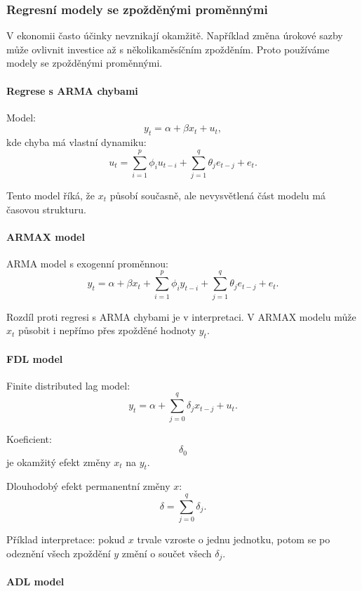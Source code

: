 \subsubsection{Regresní modely se zpožděnými proměnnými}

V ekonomii často účinky nevznikají okamžitě. Například změna úrokové sazby může ovlivnit investice
až s několikaměsíčním zpožděním. Proto používáme modely se zpožděnými proměnnými.

\paragraph{Regrese s ARMA chybami}

Model:
\[
    y_t=\alpha+\beta x_t+u_t,
\]
kde chyba má vlastní dynamiku:
\[
    u_t=
    \sum_{i=1}^{p}\phi_i u_{t-i}
    +
    \sum_{j=1}^{q}\theta_j e_{t-j}
    +e_t.
\]

Tento model říká, že $x_t$ působí současně, ale nevysvětlená část modelu má časovou strukturu.

\paragraph{ARMAX model}

ARMA model s exogenní proměnnou:
\[
    y_t=
    \alpha+\beta x_t
    +
    \sum_{i=1}^{p}\phi_i y_{t-i}
    +
    \sum_{j=1}^{q}\theta_j e_{t-j}
    +e_t.
\]

Rozdíl proti regresi s ARMA chybami je v interpretaci. V ARMAX modelu může $x_t$ působit i nepřímo
přes zpožděné hodnoty $y_t$.

\paragraph{FDL model}

Finite distributed lag model:
\[
    y_t=\alpha+\sum_{j=0}^{q}\delta_j x_{t-j}+u_t.
\]

Koeficient:
\[
    \delta_0
\]
je okamžitý efekt změny $x_t$ na $y_t$.

Dlouhodobý efekt permanentní změny $x$:
\[
    \delta=\sum_{j=0}^{q}\delta_j.
\]

Příklad interpretace: pokud $x$ trvale vzroste o jednu jednotku, potom se po odeznění všech zpoždění
$y$ změní o součet všech $\delta_j$.

\paragraph{ADL model}

